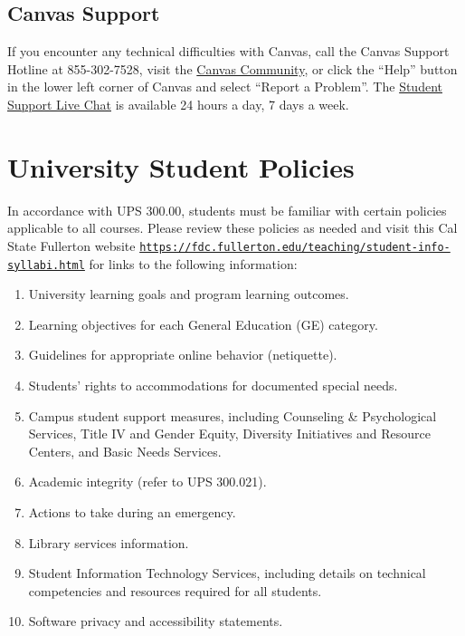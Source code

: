 \documentclass[12pt, letterpaper]{article}
\begin{document}
\subsection*{Canvas Support}

If you encounter any technical difficulties with Canvas, call the Canvas Support Hotline at 855-302-7528, visit the \href{https://community.canvaslms.com/docs/DOC-10720-67952720329}{Canvas Community}, or click the ``Help'' button in the lower left corner of Canvas and select ``Report a Problem''. The \href{https://cases.canvaslms.com/liveagentchat?chattype=student&sfid=001A000000YzcwQIAR}{Student Support Live Chat} is available 24 hours a day, 7 days a week.


\section{University Student Policies}

In accordance with UPS 300.00, students must be familiar with certain policies applicable to all courses. Please review these policies as needed and visit this Cal State Fullerton website \texttt{\href{https://fdc.fullerton.edu/teaching/student-info-syllabi.html}{https://fdc.fullerton.edu/teaching/student-info-syllabi.html}} for links to the following information:

\begin{enumerate}
    \item   University learning goals and program learning outcomes.
    \item	Learning objectives for each General Education (GE) category.
    \item	Guidelines for appropriate online behavior (netiquette).
    \item	Students’ rights to accommodations for documented special needs.
    \item   Campus student support measures, including Counseling \& Psychological Services, Title IV and Gender Equity, Diversity Initiatives and Resource Centers, and Basic Needs Services.
    \item	Academic integrity (refer to UPS 300.021).
    \item	Actions to take during an emergency.
    \item	Library services information.
    \item	Student Information Technology Services, including details on technical competencies and resources required for all students.
    \item	Software privacy and accessibility statements.
\end{enumerate}
\end{document}
